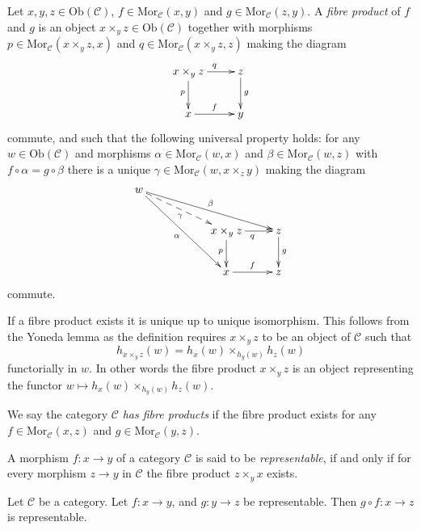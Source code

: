 \begin{definition}
\label{definition-fibre-products}
Let $x,y,z\in \text{Ob}(\mathcal{C})$,
$f\in \text{Mor}_{\mathcal{C}}(x,y)$
and $g\in \text{Mor}_{\mathcal C}(z,y)$.
A {\it fibre product} of $f$ and $g$ is
an object $x\times_y z\in \text{Ob}(\mathcal{C})$
together with morphisms 
$p\in \text{Mor}_{\mathcal C}(x\times_y z,x)$ and 
$q\in\text{Mor}_{\mathcal C}(x\times_y z,z)$ making the diagram
$$
\xymatrix{
x\times_y z \ar[r]^{q} \ar[d]_{p}
&
z \ar[d]^{g}
\\
x \ar[r]^{f}
&
y
}
$$
commute, and such that the following universal property holds: for
any $w\in \text{Ob}(\mathcal{C})$ and morphisms 
$\alpha \in \text{Mor}_{\mathcal C}(w,x)$ and 
$\beta \in \text{Mor}_{\mathcal{C}}(w,z)$ with
$f \circ \alpha= g\circ \beta$
there is a unique
$\gamma\in \text{Mor}_{\mathcal C}(w,x\times_z y)$ making
the diagram
$$
\xymatrix{
w \ar[rrrd]^\beta \ar@{-->}[rrd]_\gamma \ar[rrdd]_\alpha
&
&
\\
&
&
x\times_y z \ar[d]_{p} \ar[r]_{q}
&
z \ar[d]^{g}
\\
&
&
x \ar[r]^{f}
&
z
}
$$
commute.
\end{definition}

\noindent
If a fibre product exists it is unique up to unique
isomorphism. This follows from the Yoneda lemma as
the definition requires $x\times_yz$ to be an object
of $\mathcal{C}$ such that
$$
h_{x\times_y z}(w) = h_x(w) \times_{h_y(w)} h_z(w)
$$
functorially in $w$. In other words the fibre product $x\times_yz$
is an object representing the functor
$w \mapsto h_x(w) \times_{h_y(w)} h_z(w)$.

\begin{definition}
\label{definition-has-fibre-products}
We say the category $\mathcal{C}$ {\it has fibre products} if
the fibre product exists for any $f\in \text{Mor}_{\mathcal C}(x,z)$
and $g\in \text{Mor}_{\mathcal C}(y,z)$.
\end{definition}

\begin{definition}
\label{definition-representable-morphism}
A morphism $f : x \to y$ of a category $\mathcal{C}$ is said to be
{\it representable}, if and only if for every morphism $z \to y$
in $\mathcal{C}$ the fibre product $z\times_y x$ exists.
\end{definition}

\begin{lemma}
\label{lemma-composition-representable}
Let $\mathcal{C}$ be a category.
Let $f : x \to y$, and $g : y \to z$ be representable.
Then $g \circ f : x \to z$ is representable.
\end{lemma}

